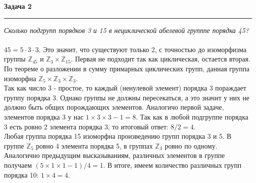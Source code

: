 \documentclass[a4paper,11pt]{article}
\begin{document}
\textbf{\large Задача 2}
\medskip\hrule\medskip
\textit{Сколько подгрупп порядков 3 и 15 в нециклической абелевой групппе порядка 45? }	\\ \\ 
$ 45 = 5 \cdot 3 \cdot 3 $. Это значит, что существуют только 2, с точностью до изоморфизма группы $ \mathbb{Z}_{45} $ и $ \mathbb{Z}_3 \times \mathbb{Z}_{15} $. Первая не подходит так как циклическая, остается вторая. По теореме о разложении в сумму примарных циклических групп, данная группа изоморфна $ \mathbb{Z}_5 \times \mathbb{Z}_{3} \times \mathbb{Z}_{3} $.   \\[2pt]
Так как число 3 - простое, то каждый (ненулевой элемент) порядка 3 пораждает группу порядка 3. Однако группы не должны пересекаться, а это значит у них не должно быть общих порождающих элементов. Аналогичо первой задаче, элементов порядка 3 у нас $ 1 \times 3 \times 3 - 1 = 8 $. Так как в любой подгруппе порядка 3 есть ровно 2 элемента порядка 3, то итоговый ответ: $ 8 / 2 = 4 $.  \\[2pt]
Любая группа порядка 15 изоморфна произведению групп порядка 3 и 5. В группе $ \mathbb{Z}_5 $ ровно 4 элемента порядка 5, в группах $ \mathbb{Z}_3 $ ровно по одному. Аналогично предыдущим высказываниям, различных элементов в группе получаем $ (5 \times 1 \times 1 - 1) / 4 = 1 $. В итоге, имеем количество различных групп порядка 10: $ 1 \times 4 = 4 $. \\ \\ \\





\end{document}
